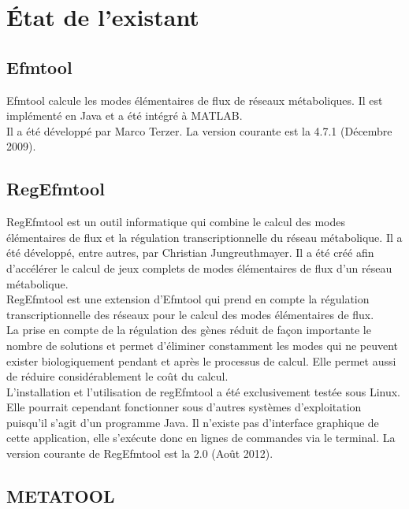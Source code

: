 \documentclass[12pt,a4paper]{report}
\begin{document}
\chapter{État de l'existant}

\section{Efmtool}

\noindent Efmtool calcule les modes élémentaires de flux de réseaux métaboliques. Il est implémenté en Java et a été intégré à MATLAB.\\
Il a été développé par Marco Terzer. La version courante est la 4.7.1 (Décembre 2009).

\section{RegEfmtool}

\noindent RegEfmtool est un outil informatique qui combine le calcul des modes élémentaires de flux et la régulation transcriptionnelle du réseau métabolique. Il a été développé, entre autres, par Christian Jungreuthmayer. Il a été créé afin d'accélérer le calcul de jeux complets de modes élémentaires de flux d'un réseau métabolique.\\
RegEfmtool est une extension d'Efmtool qui prend en compte la régulation transcriptionnelle des réseaux pour le calcul des modes élémentaires de flux.\\
La prise en compte de la régulation des gènes réduit de façon importante le nombre de solutions et permet d'éliminer constamment les modes qui ne peuvent exister biologiquement pendant et après le processus de calcul. Elle permet aussi de réduire considérablement le coût du calcul.\\
L'installation et l'utilisation de regEfmtool a été exclusivement testée sous Linux. Elle pourrait cependant fonctionner sous d'autres systèmes d'exploitation puisqu'il s'agit d'un programme Java. Il n'existe pas d'interface graphique de cette application, elle s'exécute donc en lignes de commandes via le terminal.
La version courante de RegEfmtool est la 2.0 (Août 2012).

\section{METATOOL} 
\end{document}
